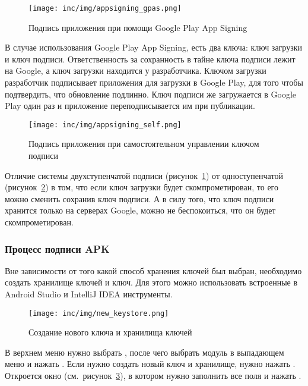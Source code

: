 \begin{figure}[ht]
  \texttt{[image: inc/img/appsigning\_gpas.png]}
  \caption{Подпись приложения при помощи Google Play App Signing}
  \label{fig:appsigningGpas}
\end{figure}

В случае использования Google Play App Signing, есть два ключа: ключ загрузки и ключ подписи.
Ответственность за сохранность в тайне ключа подписи лежит на Google, а ключ загрузки находится у разработчика.
Ключом загрузки разработчик подписывает приложения для загрузки в Google Play, для того чтобы подтвердить, что обновление подлинно.
Ключ подписи же загружается в Google Play один раз и приложение переподписывается им при публикации.

\begin{figure}[ht]
  \texttt{[image: inc/img/appsigning\_self.png]}
  \caption{Подпись приложения при самостоятельном управлении ключом подписи}
  \label{fig:appsigningSelf}
\end{figure}

Отличие системы двухступенчатой подписи (рисунок~\ref{fig:appsigningGpas}) от одноступенчатой (рисунок~\ref{fig:appsigningSelf}) в том, что если ключ загрузки будет скомпрометирован, то его можно сменить сохранив ключ подписи.
А в силу того, что ключ подписи хранится только на серверах Google, можно не беспокоиться, что он будет скомпрометирован.

\subsubsection*{Процесс подписи APK}

Вне зависимости от того какой способ хранения ключей был выбран, необходимо создать хранилище ключей и ключ.
Для этого можно использовать встроенные в Android Studio и IntelliJ IDEA инструменты.

\begin{figure}[ht]
  \centering
  \texttt{[image: inc/img/new\_keystore.png]}
  \caption{Создание нового ключа и хранилища ключей}
  \label{fig:newKeystore}
\end{figure}

В верхнем меню нужно выбрать , после чего выбрать модуль в выпадающем меню и нажать .
Если нужно создать новый ключ и хранилище, нужно нажать .
Откроется окно  (см.~рисунок~\ref{fig:newKeystore}), в котором нужно заполнить все поля и нажать .

